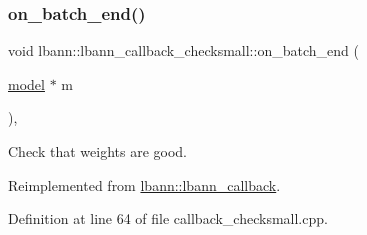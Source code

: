 \subsubsection{\texorpdfstring{on\+\_\+batch\+\_\+end()}{on\_batch\_end()}}
{\footnotesize\ttfamily void lbann\+::lbann\+\_\+callback\+\_\+checksmall\+::on\+\_\+batch\+\_\+end (\begin{DoxyParamCaption}\item[{\hyperlink{classlbann_1_1model}{model} $\ast$}]{m }\end{DoxyParamCaption})\hspace{0.3cm}{\ttfamily [override]}, {\ttfamily [virtual]}}

Check that weights are good. 

Reimplemented from \hyperlink{classlbann_1_1lbann__callback_a895ca577e358601fcae5c04749f60535}{lbann\+::lbann\+\_\+callback}.



Definition at line 64 of file callback\+\_\+checksmall.\+cpp.


